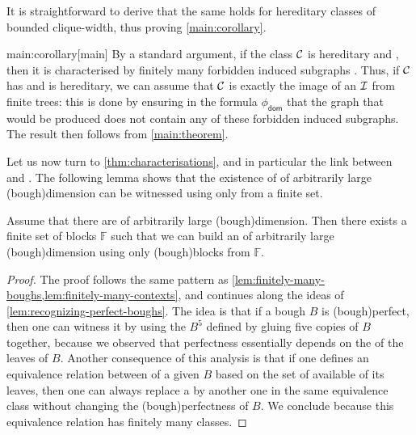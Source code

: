 It is straightforward to derive that the same holds for hereditary classes of
bounded clique-width, thus proving \cref{main:corollary}.


\begin{proofof}{main:corollary}[main]
  By a standard argument, if the class $\Cls$ is hereditary
  and , then it is characterised by finitely many
  forbidden induced subgraphs \cite[Proposition 3]{DRT10}.
  Thus, if $\Cls$ has  and is hereditary,
  we can assume that $\Cls$ is exactly the image of an 
  $\mathcal{I}$ from finite trees: this is done by 
  ensuring in the formula $\phi_{\mathsf{dom}}$ that 
  the graph that would be produced does not contain any of these forbidden induced subgraphs.
  The result then follows from
  \cref{main:theorem}.
\end{proofof}


Let us now turn to \cref{thm:characterisations},
and in particular the link between  and
. The following lemma shows that
the existence of  of arbitrarily large \kl(bough){dimension}
can be witnessed using only  from a finite set.

\begin{lemma}[name={},restate={lem:hereditary-perfect-boughs}]
  \label{lem:hereditary-perfect-boughs}
  Assume that there are  of arbitrarily large \kl(bough){dimension}.
  Then there exists a finite set of blocks $\mathbb{F}$ such that 
  we can build an  of arbitrarily large \kl(bough){dimension}
  using only \kl(bough){blocks} from $\mathbb{F}$.
\end{lemma}

\begin{proof}
  The proof follows the same pattern 
  as \cref{lem:finitely-many-boughs,lem:finitely-many-contexts},
  and continues along the ideas of \cref{lem:recognizing-perfect-boughs}.
  The idea is that if a bough $B$ is \kl(bough){perfect}, then 
  one can witness it by using the  $B^5$ 
  defined by gluing five copies of $B$ together, because we observed
  that perfectness essentially depends on the  of the leaves
  of $B$. 
  Another consequence of this analysis is that if one defines an equivalence relation between
   of a given  $B$ based on the set of 
  available  of its leaves, then 
  one can always replace a  by another one in the same
  equivalence class without changing the \kl(bough){perfectness} of $B$.
  We conclude because this equivalence relation has finitely many classes.
\end{proof}


